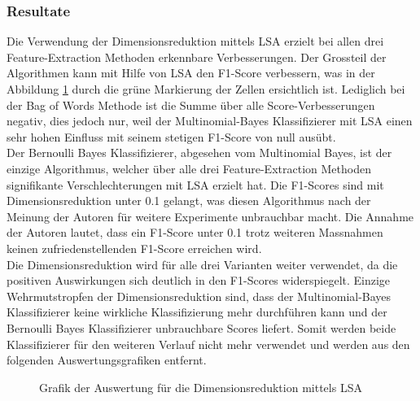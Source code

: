 \subsubsection{Resultate}
Die Verwendung der Dimensionsreduktion mittels LSA erzielt bei allen drei Feature-Extraction Methoden erkennbare Verbesserungen.
Der Grossteil der Algorithmen kann mit Hilfe von LSA den F1-Score verbessern, was in der Abbildung \cref{abb:dimred} durch die grüne Markierung der Zellen ersichtlich ist.
Lediglich bei der \glqq Bag of Words\grqq{} Methode ist die Summe über alle Score-Verbesserungen negativ, dies jedoch nur, weil der Multinomial-Bayes Klassifizierer mit LSA einen sehr hohen Einfluss mit seinem stetigen F1-Score von null ausübt.\\
Der Bernoulli Bayes Klassifizierer, abgesehen vom Multinomial Bayes, ist der einzige Algorithmus, welcher über alle drei Feature-Extraction Methoden signifikante Verschlechterungen mit LSA erzielt hat. Die F1-Scores sind mit Dimensionsreduktion unter 0.1 gelangt, was diesen Algorithmus nach der Meinung der Autoren für weitere Experimente unbrauchbar macht. Die Annahme der Autoren lautet, dass ein F1-Score unter 0.1 trotz weiteren Massnahmen keinen zufriedenstellenden F1-Score erreichen wird.\\
Die Dimensionsreduktion wird für alle drei Varianten weiter verwendet, da die positiven Auswirkungen sich deutlich in den F1-Scores widerspiegelt.
Einzige Wehrmutstropfen der Dimensionsreduktion sind, dass der Multinomial-Bayes Klassifizierer keine wirkliche Klassifizierung mehr durchführen kann und der Bernoulli Bayes Klassifizierer unbrauchbare Scores liefert.
Somit werden beide Klassifizierer für den weiteren Verlauf nicht mehr verwendet und werden aus den folgenden Auswertungsgrafiken entfernt.
\begin{figure}[H]
	\setlength{\fboxsep}{0.3pt} 
	\setlength{\fboxrule}{0.3pt} 
	\caption{Grafik der Auswertung für die Dimensionsreduktion mittels LSA}
	\label{abb:dimred}
\end{figure}
